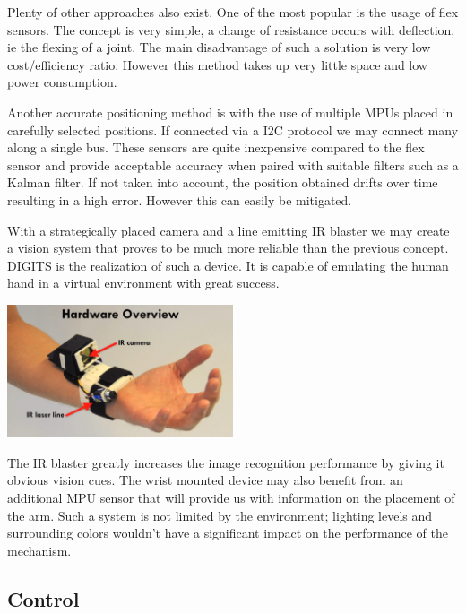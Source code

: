 \documentclass{article}
\begin{document}
Plenty of other approaches also exist. One of the most popular is the usage of flex sensors. The concept is very simple, a change of resistance occurs with deflection, ie the flexing of a joint. The main disadvantage of such a solution is very low cost/efficiency ratio. However this method takes up very little space and low power consumption.

Another accurate positioning method is with the use of multiple MPUs placed in carefully selected positions. If connected via a I2C protocol we may connect many along a single bus. These sensors are quite inexpensive compared to the flex sensor and provide acceptable accuracy when paired with suitable filters such as a Kalman filter. If not taken into account, the position obtained drifts over time resulting in a high error. However this can easily be mitigated.

With a strategically placed camera and a line emitting IR blaster we may create a vision system that proves to be much more reliable than the previous concept. DIGITS \cite{Digits} is the realization of such a device. It is capable of emulating the human hand in a virtual environment with great success.

\begin{center}
\includegraphics[width=0.5\textwidth]{IMG/HandSens02.png}
\end{center}

\indent The IR blaster greatly increases the image recognition performance by giving it obvious vision cues. The wrist mounted device may also benefit from an additional MPU sensor that will provide us with information on the placement of the arm. Such a system is not limited by the environment; lighting levels and surrounding colors wouldn't have a significant impact on the performance of the mechanism.

\subsection{Control}
\end{document}
